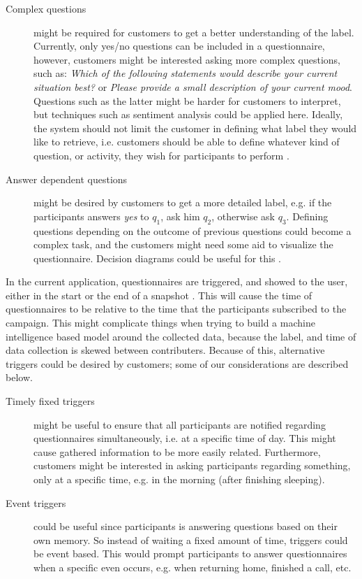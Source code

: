 \begin{description}
  	\item[Complex questions] might be required for customers to get a better understanding of the label. Currently, only yes/no questions can be included in a questionnaire, however, customers might be interested asking more complex questions, such as: \emph{Which of the following statements would describe your current situation best?} or \emph{Please provide a small description of your current mood}. Questions such as the latter might be harder for customers to interpret, but techniques such as  sentiment analysis could be applied here. Ideally, the system should not limit the customer in defining what label they would like to retrieve, i.e. customers should be able to define whatever kind of question, or activity, they wish for participants to perform . 

  	\item[Answer dependent questions] might be desired by customers to get a more detailed label, e.g. if the participants answers \emph{yes} to $q_1$, ask him $q_2$, otherwise ask $q_3$. Defining questions depending on the outcome of previous questions could become a complex task, and the customers might need some aid to visualize the questionnaire. Decision diagrams could be useful for this .
\end{description}

In the current application, questionnaires are triggered, and showed to the user, either in the start or the end of a snapshot . This will cause the time of questionnaires to be relative to the time that the participants subscribed to the campaign. This might complicate things when trying to build a machine intelligence based model around the collected data, because the label, and time of data collection is skewed between contributers. Because of this, alternative triggers could be desired by customers; some of our considerations are described below.

\begin{description}
   	\item[Timely fixed triggers] might be useful to ensure that all participants are notified regarding questionnaires simultaneously, i.e. at a specific time of day. This might cause gathered information to be more easily related. Furthermore, customers might be interested in asking participants regarding something, only at a specific time, e.g. in the morning (after finishing sleeping). 

   	\item[Event triggers] could be useful since participants is answering questions based on their own memory. So instead of waiting a fixed amount of time, triggers could be event based. This would prompt participants to answer questionnaires when a specific even occurs, e.g. when returning home, finished a call, etc.    
\end{description}    

